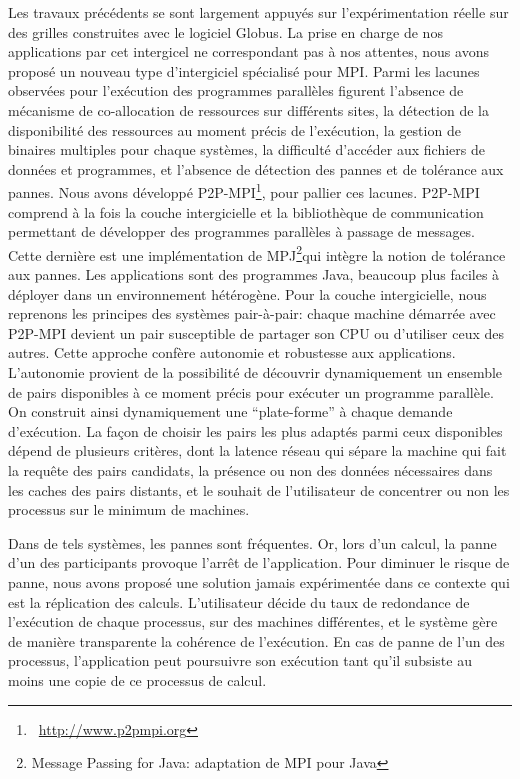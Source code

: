 \documentclass[11pt]{article}
\newcommand{\pmpi}{\mbox{\textsc{P2P-MPI}}}
\begin{document}
Les travaux précédents se sont largement appuyés sur l'expérimentation réelle
sur des grilles construites avec le logiciel Globus. La prise en charge de nos 
applications par cet intergicel ne correspondant pas à nos attentes, nous avons 
proposé un nouveau type d'intergiciel spécialisé pour MPI. Parmi les 
lacunes observées pour l'exécution des programmes parallèles figurent l'absence 
de mécanisme de co-allocation de ressources sur différents sites, la détection 
de la disponibilité des ressources au moment précis de l'exécution, la gestion 
de binaires multiples pour chaque systèmes, la difficulté d'accéder aux fichiers
de données et programmes, et l'absence de détection des pannes et de tolérance 
aux pannes. Nous avons développé {\pmpi}\footnote{~\url{http://www.p2pmpi.org}},
pour pallier ces lacunes. {\pmpi} comprend à la fois la couche intergicielle et 
la bibliothèque de communication permettant de développer des programmes 
parallèles à passage de messages. Cette dernière est une implémentation de 
MPJ\footnote{Message Passing for Java: adaptation de MPI pour Java}qui intègre 
la notion de tolérance aux pannes. Les applications sont des programmes Java, 
beaucoup plus faciles à déployer dans un environnement hétérogène.
Pour la couche intergicielle, nous reprenons les principes des systèmes 
pair-à-pair: chaque machine démarrée avec {\pmpi} devient un pair susceptible 
de partager son CPU ou d'utiliser ceux des autres. Cette approche confère 
autonomie et robustesse aux applications. L'autonomie provient de la 
possibilité de découvrir dynamiquement un ensemble de pairs disponibles à ce 
moment précis pour exécuter un programme parallèle. On construit ainsi 
dynamiquement une ``plate-forme'' à chaque demande d'exécution. La façon de 
choisir les pairs les plus adaptés parmi ceux disponibles dépend de plusieurs 
critères, dont la latence réseau qui sépare la machine qui fait la requête des 
pairs candidats, la présence ou non des données nécessaires dans les caches des 
pairs distants, et le souhait de l'utilisateur de concentrer ou non les 
processus sur le minimum de machines. 

Dans de tels systèmes, les pannes sont fréquentes. Or, lors d'un calcul, la 
panne d'un des participants provoque l'arrêt de l'application. Pour diminuer le 
risque de panne, nous avons proposé une solution jamais expérimentée dans ce 
contexte qui est la réplication des calculs. L'utilisateur décide du taux de 
redondance de l'exécution de chaque processus, sur des machines différentes, et 
le système gère de manière transparente la cohérence de l'exécution. En cas de 
panne de l'un des processus, l'application peut poursuivre son exécution tant 
qu'il subsiste au moins une copie de ce processus de calcul.\\
\end{document}
